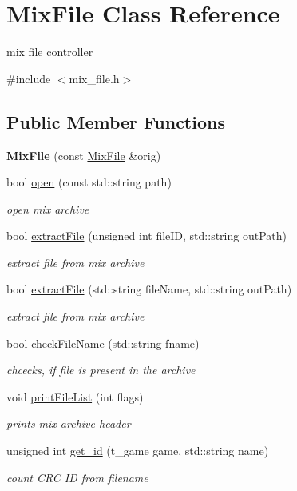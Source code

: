 \hypertarget{class_mix_file}{
\section{MixFile Class Reference}
\label{class_mix_file}
}


mix file controller  




{\ttfamily \#include $<$mix\_\-file.h$>$}

\subsection*{Public Member Functions}
\begin{DoxyCompactItemize}
\item 
\hypertarget{class_mix_file_ac88416ea295349a8c834011520359599}{
{\bfseries MixFile} (const \hyperlink{class_mix_file}{MixFile} \&orig)}
\label{class_mix_file_ac88416ea295349a8c834011520359599}

\item 
bool \hyperlink{class_mix_file_a34cecccdab75e6533ed3cec0aaa1eae1}{open} (const std::string path)
\begin{DoxyCompactList}\small\item\em open mix archive \end{DoxyCompactList}\item 
bool \hyperlink{class_mix_file_a458c3723fe0f985a61e2063568f872fb}{extractFile} (unsigned int fileID, std::string outPath)
\begin{DoxyCompactList}\small\item\em extract file from mix archive \end{DoxyCompactList}\item 
bool \hyperlink{class_mix_file_a05fa448bc3507d58b85cfa3831c2f3b2}{extractFile} (std::string fileName, std::string outPath)
\begin{DoxyCompactList}\small\item\em extract file from mix archive \end{DoxyCompactList}\item 
bool \hyperlink{class_mix_file_aa3c889a76f66b8508d38d63ccba3412b}{checkFileName} (std::string fname)
\begin{DoxyCompactList}\small\item\em chcecks, if file is present in the archive \end{DoxyCompactList}\item 
void \hyperlink{class_mix_file_a0bc648cc742736c22513d394946e75fe}{printFileList} (int flags)
\begin{DoxyCompactList}\small\item\em prints mix archive header \end{DoxyCompactList}\item 
unsigned int \hyperlink{class_mix_file_acf262bbfb22ab6b71f07626549105017}{get\_\-id} (t\_\-game game, std::string name)
\begin{DoxyCompactList}\small\item\em count CRC ID from filename \end{DoxyCompactList}\end{DoxyCompactItemize}


